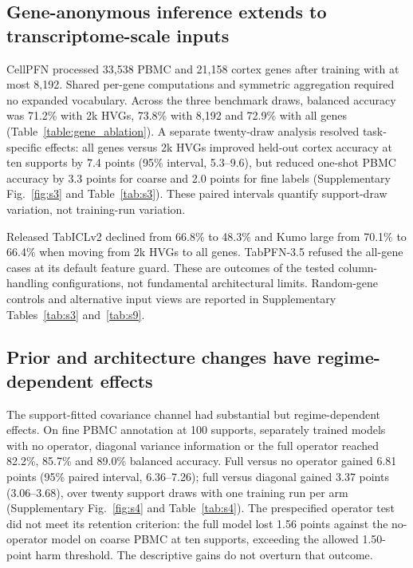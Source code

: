 \subsection*{Gene-anonymous inference extends to transcriptome-scale inputs}

CellPFN processed 33,538 PBMC and 21,158 cortex genes after training with at most 8,192. Shared per-gene computations and symmetric aggregation required no expanded vocabulary. Across the three benchmark draws, balanced accuracy was 71.2\% with 2k HVGs, 73.8\% with 8,192 and 72.9\% with all genes (Table~\ref{table:gene_ablation}). A separate twenty-draw analysis resolved task-specific effects: all genes versus 2k HVGs improved held-out cortex accuracy at ten supports by 7.4 points (95\% interval, 5.3--9.6), but reduced one-shot PBMC accuracy by 3.3 points for coarse and 2.0 points for fine labels (Supplementary Fig.~\ref{fig:s3} and Table~\ref{tab:s3}). These paired intervals quantify support-draw variation, not training-run variation.

Released TabICLv2 declined from 66.8\% to 48.3\% and Kumo large from 70.1\% to 66.4\% when moving from 2k HVGs to all genes. TabPFN-3.5 refused the all-gene cases at its default feature guard\cite{jaeger2026tabpfn35,priorlabs2026tabpfn35card}. These are outcomes of the tested column-handling configurations, not fundamental architectural limits. Random-gene controls and alternative input views are reported in Supplementary Tables~\ref{tab:s3} and~\ref{tab:s9}.

\subsection*{Prior and architecture changes have regime-dependent effects}

The support-fitted covariance channel had substantial but regime-dependent effects. On fine PBMC annotation at 100 supports, separately trained models with no operator, diagonal variance information or the full operator reached 82.2\%, 85.7\% and 89.0\% balanced accuracy. Full versus no operator gained 6.81 points (95\% paired interval, 6.36--7.26); full versus diagonal gained 3.37 points (3.06--3.68), over twenty support draws with one training run per arm (Supplementary Fig.~\ref{fig:s4} and Table~\ref{tab:s4}). The prespecified operator test did not meet its retention criterion: the full model lost 1.56 points against the no-operator model on coarse PBMC at ten supports, exceeding the allowed 1.50-point harm threshold. The descriptive gains do not overturn that outcome.

